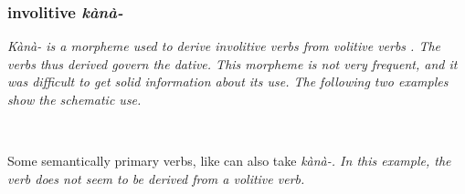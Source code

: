 





% 
% 
%  





\subsubsection{involitive \em kànà-\em}\label{sec:morph:kana-}

\em Kànà- \em is a morpheme used to derive involitive verbs from volitive verbs . The verbs thus derived govern the dative.  This morpheme is not very frequent, and it was difficult to get solid information about its use. The following two examples show the schematic use.


 \\ 



Some semantically primary verbs, like  can also take \em kànà-\em. In this example, the verb does not seem to be derived from a volitive verb.

